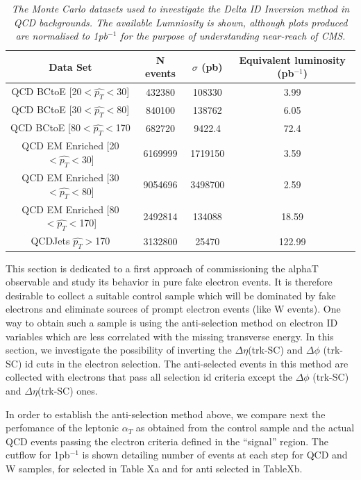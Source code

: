 \documentclass[12pt]{article}
\begin{document}
\begin{table}[h!]
\begin{center}
\begin{tabular}{|c|c|c|c|}
\hline
Data Set & N events & $\sigma$ (pb) & Equivalent luminosity (pb$^{-1}$)\\
\hline
QCD BCtoE [20$<\hat{p_{T}}<$30]& 432380  & 108330 & 3.99\\
QCD BCtoE [30$<\hat{p_{T}}<$80] & 840100 & 138762 & 6.05\\
QCD BCtoE [80$<\hat{p_{T}}<$170 & 682720 & 9422.4 &72.4\\
QCD EM Enriched [20$<\hat{p_{T}}<$30] & 6169999 & 1719150 & 3.59\\
QCD EM Enriched [30$<\hat{p_{T}}<$80] & 9054696 & 3498700 & 2.59\\
QCD EM Enriched [80$<\hat{p_{T}}<$170] & 2492814 & 134088 & 18.59\\
QCDJets $\hat{p_{T}}>$170 & 3132800 & 25470 & 122.99\\
\hline
\end{tabular}
\end{center}
\caption{\textit{The Monte Carlo datasets used to investigate the Delta ID Inversion method in QCD backgrounds. The available Lumniosity is shown, although plots produced are normalised to 1pb$^{-1}$ for the purpose of understanding near-reach of CMS.}}
\label{tab:datasets}
\end{table}

This section is dedicated to a first approach of commissioning the alphaT observable and study its behavior in pure fake electron events. It is therefore desirable to collect a suitable control sample which will be dominated by fake electrons and eliminate sources of prompt electron events (like W events).
One way to obtain such a sample is using the anti-selection method on electron ID variables which are less correlated with the missing transverse energy. In this section, we investigate the possibility of inverting the $\Delta \eta$(trk-SC) and $\Delta \phi$ (trk-SC) id cuts in the electron selection. The anti-selected events in this method are collected with electrons that pass all selection id criteria except the $\Delta \phi$ (trk-SC) and $\Delta \eta$(trk-SC) ones. 

In order to establish the anti-selection method above, we compare next the perfomance of the leptonic $\alpha_T$ as obtained from the control sample and the actual QCD events passing the electron criteria defined in the ``signal'' region. The cutflow for 1pb$^{-1}$ is shown detailing number of events at each step for QCD and W samples, for selected in Table Xa and for anti selected in TableXb. 
\end{document}
